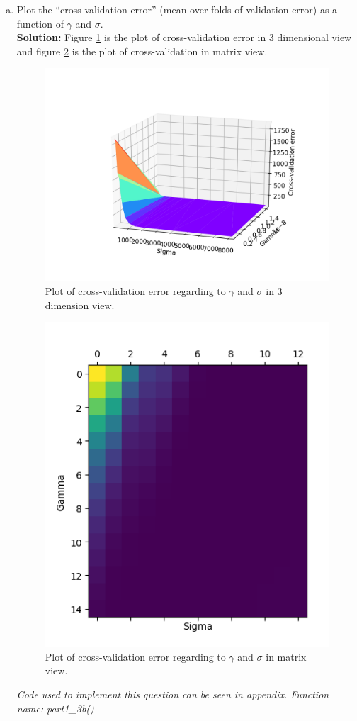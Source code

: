 \documentclass[A4,12pt]{article}
\begin{document}
\begin{enumerate}[5.]
\begin{enumerate}[a.]
    \item Plot the “cross-validation error” (mean over folds of validation error) as a function of $\gamma$ and $\sigma$.\\
    \textbf{Solution:} Figure \ref{fig:5b1} is the plot of cross-validation error in 3 dimensional view and figure \ref{fig:5b2} is the plot of cross-validation in matrix view.\\
        \begin{figure}
        \centering \includegraphics[width=0.8\columnwidth]{5b1}
        \caption{
          \label{fig:5b1}
          Plot of cross-validation error regarding to $\gamma$ and $\sigma$ in 3 dimension view.
        }
        \end{figure}
        \begin{figure}
        \centering \includegraphics[width=0.8\columnwidth]{5b2}
        \caption{
          \label{fig:5b2}
          Plot of cross-validation error regarding to $\gamma$ and $\sigma$ in matrix view.
        }
        \end{figure}
    \textit{Code used to implement this question can be seen in appendix. Function name: part1\_3b()}
    

\end{enumerate}
\end{enumerate}
\end{document}
